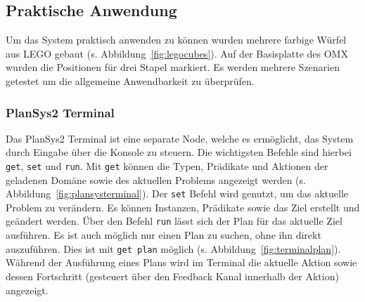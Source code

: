 \subsection{Praktische Anwendung}
Um das System praktisch anwenden zu können wurden mehrere farbige Würfel aus LEGO gebaut (s. Abbildung~\ref{fig:legocubes}).
Auf der Basisplatte des OMX wurden die Positionen für drei Stapel markiert.
Es werden mehrere Szenarien getestet um die allgemeine Anwendbarkeit zu überprüfen.
\subsubsection{PlanSys2 Terminal}
Das \ac{PlanSys2} Terminal ist eine separate Node, welche es ermöglicht, das System durch Eingabe über die Konsole zu steuern.
Die wichtigsten Befehle sind hierbei \verb|get|, \verb|set| und \verb|run|.
Mit \verb|get| können die Typen, Prädikate und Aktionen der geladenen Domäne sowie des aktuellen Problems angezeigt werden (s. Abbildung~\ref{fig:plansysterminal}).
Der \verb|set| Befehl wird genutzt, um das aktuelle Problem zu verändern.
Es können Instanzen, Prädikate sowie das Ziel erstellt und geändert werden.
Über den Befehl \verb|run| lässt sich der Plan für das aktuelle Ziel ausführen.
Es ist auch möglich nur einen Plan zu suchen, ohne ihn direkt auszuführen.
Dies ist mit \verb|get plan| möglich (s. Abbildung~\ref{fig:terminalplan}).\\
Während der Ausführung eines Plans wird im Terminal die aktuelle Aktion sowie dessen Fortschritt (gesteuert über den Feedback Kanal innerhalb der Aktion) angezeigt.
